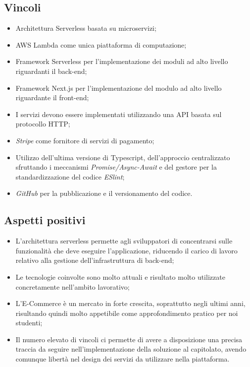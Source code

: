 \subsection{Vincoli}{
\begin{itemize}
\item Architettura Serverless basata su microservizi;
\item AWS Lambda come unica piattaforma di computazione;
\item Framework Serverless per l'implementazione dei moduli ad alto livello riguardanti il back-end;
\item Framework Next.js per l'implementazione del modulo ad alto livello riguardante il front-end;
\item I servizi devono essere implementati utilizzando una API basata sul protocollo HTTP;
\item \textit{Stripe} come fornitore di servizi di pagamento;
\item Utilizzo dell'ultima versione di Typescript, dell'approccio centralizzato sfruttando i meccanismi \textit{Promise/Async-Await} e del gestore per la standardizzazione del codice \textit{ESlint};
\item \textit{GitHub} per la pubblicazione e il versionamento del codice.
\end{itemize}
}

\subsection{Aspetti positivi}{
\begin{itemize}
\item L'architettura serverless permette agli sviluppatori di concentrarsi sulle funzionalità che deve eseguire l'applicazione, riducendo il carico di lavoro relativo alla gestione dell'infrastruttura di back-end;
\item Le tecnologie coinvolte sono molto attuali e risultato molto utilizzate concretamente nell'ambito lavorativo;
\item L'E-Commerce è un mercato in forte crescita, soprattutto negli ultimi anni, risultando quindi molto appetibile come approfondimento pratico per noi studenti;
\item Il numero elevato di vincoli ci permette di avere a disposizione una precisa traccia da seguire nell'implementazione della soluzione al capitolato, avendo comunque libertà nel design dei servizi da utilizzare nella piattaforma.
\end{itemize}
}

